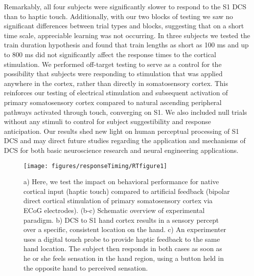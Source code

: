 Remarkably, all four subjects were significantly slower to respond to the S1 DCS than to haptic touch. Additionally, with our two blocks of testing we saw no significant differences between trial types and blocks, suggesting that on a short time scale, appreciable learning was not occurring. In three subjects we tested the train duration hypothesis and found that train lengths as short as 100 ms and up to 800 ms did not significantly affect the response times to the cortical stimulation. We performed off-target testing to serve as a control for the possibility that subjects were responding to stimulation that was applied anywhere in the cortex, rather than directly in somatosensory cortex. This reinforces our testing of electrical stimulation and subsequent activation of primary somatosensory cortex compared to natural ascending peripheral pathways activated through touch, converging on S1. We also included null trials without any stimuli to control for subject suggestibility and response anticipation. Our results shed new light on human perceptual processing of S1 DCS and may direct future studies regarding the application and mechanisms of DCS for both basic neuroscience research and neural engineering applications.

\begin{figure}[ht]
	\centering
	\texttt{[image: figures/responseTiming/RTfigure1]}
	\caption[Experimental protocol]{a) Here, we test the impact on behavioral performance for native cortical input (haptic touch) compared to artificial feedback (bipolar direct cortical stimulation of primary somatosensory cortex via ECoG electrodes). (b-c) Schematic overview of experimental paradigm. b) DCS to S1 hand cortex results in a sensory percept over a specific, consistent location on the hand. c) An experimenter uses a digital touch probe to provide haptic feedback to the same hand location. The subject then responds in both cases as soon as he or she feels sensation in the hand region, using a button held in the opposite hand to perceived sensation.}
	\label{fig:RTschematic}
\end{figure}

